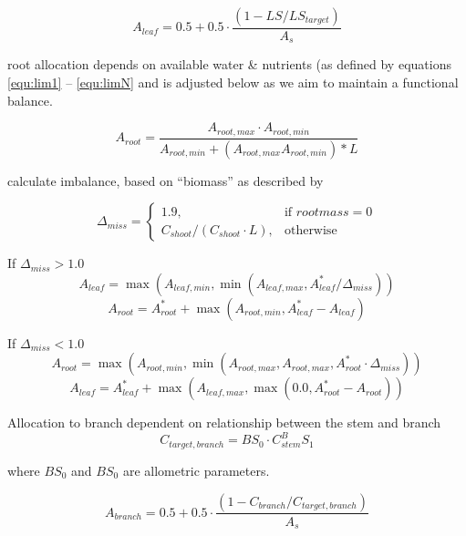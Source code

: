 \begin{equation}
	A_{leaf} = 0.5 + 0.5 \cdot \dfrac{(1-LS/LS_{target})}{A_{s}}
	\label{AleafAllometric}
\end{equation}

root allocation depends on available water \& nutrients (as defined by equations \ref{equ:lim1} -- \ref{equ:limN} and is adjusted below as we aim to maintain a functional balance.

\begin{equation}
	A_{root} = \dfrac{A_{root,max} \cdot A_{root,min}}{A_{root,min} + (A_{root,max} A_{root,min})*L}
\end{equation}

calculate imbalance, based on ``biomass'' as described by \citet{sitch2003}

\begin{equation}
	\Delta_{miss}=
	\begin{cases}
	    1.9,& \text{if } root mass = 0 \\
	    C_{shoot}/(C_{shoot} \cdot L),& \text{otherwise}
	\end{cases}
\end{equation}

If $\Delta_{miss} > 1.0$ 
\begin{equation}
	A_{leaf} = \max (A_{leaf,min}, \min (A_{leaf,max}, A_{leaf}^* / \Delta_{miss}))
\end{equation}
\begin{equation}
	A_{root} = A_{root}^* + \max (A_{root,min}, A_{leaf}^* - A_{leaf})
\end{equation}

If $\Delta_{miss} < 1.0$ 
\begin{equation}
	A_{root} = \max (A_{root,min}, \min (A_{root,max},A_{root,max}, A_{root}^* \cdot \Delta_{miss}))
\end{equation}
\begin{equation}
	A_{leaf} = A_{leaf}^* + \max (A_{leaf,max}, \max(0.0, A_{root}^* - A_{root}))
\end{equation}


Allocation to branch dependent on relationship between the stem and branch
\begin{equation}
	C_{target,branch} = BS_{0} \cdot C_{stem}^BS_{1}
\end{equation}

where $BS_{0}$ and $BS_{0}$ are allometric parameters.

\begin{equation}
	A_{branch} = 0.5 + 0.5 \cdot \dfrac{(1-C_{branch}/C_{target,branch})}{A_{s}}
\end{equation}

